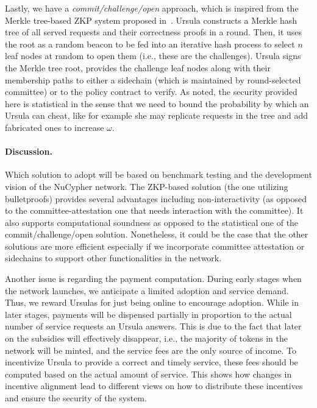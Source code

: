 \documentclass{llncs}
\begin{document}
Lastly, we have a \emph{commit/challenge/open} approach, which is inspired from the Merkle tree-based ZKP system proposed in~\cite{dottling19}. Ursula constructs a Merkle hash tree of all served requests and their correctness proofs in a round. Then, it uses the root as a random beacon to be fed into an iterative hash process to select $n$ leaf nodes at random to open them (i.e., these are the challenges). Ursula signs the Merkle tree root, provides the challenge leaf nodes along with their membership paths to either a sidechain (which is maintained by round-selected committee) or to the policy contract to verify. As noted, the security provided here is statistical in the sense that we need to bound the probability by which an Ursula can cheat, like for example she may replicate requests in the tree and add fabricated ones to increase $\omega$. 


\paragraph{Discussion.} Which solution to adopt will be based on benchmark testing and the development vision of the NuCypher network. The ZKP-based solution (the one utilizing bulletproofs) provides several advantages including non-interactivity (as opposed to the committee-attestation one that needs interaction with the committee). It also supports computational soundness as opposed to the statistical one of the commit/challenge/open solution. Nonetheless, it could be the case that the other solutions are more efficient especially if we incorporate committee attestation or sidechains to support other functionalities in the network. 


Another issue is regarding the payment computation. During early stages when the network launches, we anticipate a limited adoption and service demand. Thus, we reward Ursulas for just being online to encourage adoption. While in later stages, payments will be dispensed partially in proportion to the actual number of service requests an Ursula answers. This is due to the fact that later on the subsidies will effectively disappear, i.e., the majority of tokens in the network will be minted, and the service fees are the only source of income. To incentivize Ursula to provide a correct and timely service, these fees should be computed based on the actual amount of service. This shows how changes in incentive alignment lead to different views on how to distribute these incentives and ensure the security of the system.
\end{document}
